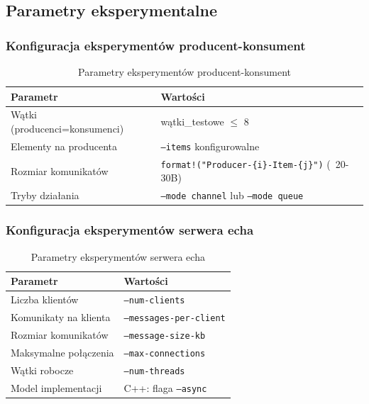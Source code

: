 \subsection{Parametry eksperymentalne}

\subsubsection{Konfiguracja eksperymentów producent-konsument}
\begin{table}[h]
\centering
\caption{Parametry eksperymentów producent-konsument}
\begin{tabular}{ll}
\hline
\textbf{Parametr} & \textbf{Wartości} \\
\hline
Wątki (producenci=konsumenci) & wątki\_testowe $\leq$ 8 \\
Elementy na producenta & \texttt{--items} konfigurowalne \\
Rozmiar komunikatów & \texttt{format!("Producer-\{i\}-Item-\{j\}")} (~20-30B) \\
Tryby działania & \texttt{--mode channel} lub \texttt{--mode queue} \\
\hline
\end{tabular}

\end{table}

\subsubsection{Konfiguracja eksperymentów serwera echa}
\begin{table}[h]
\centering
\caption{Parametry eksperymentów serwera echa}
\begin{tabular}{ll}
\hline
\textbf{Parametr} & \textbf{Wartości} \\
\hline
Liczba klientów & \texttt{--num-clients} \\
Komunikaty na klienta & \texttt{--messages-per-client} \\
Rozmiar komunikatów & \texttt{--message-size-kb} \\
Maksymalne połączenia & \texttt{--max-connections} \\
Wątki robocze & \texttt{--num-threads} \\
Model implementacji & C++: flaga \texttt{--async} \\
\hline
\end{tabular}

\end{table}

